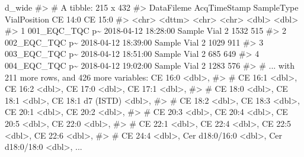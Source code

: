 \documentclass[
  letterpaper,
  DIV=11,
  numbers=noendperiod]{scrreprt}
\newenvironment{Shaded}{\begin{snugshade}}{\end{snugshade}}
\newcommand{\CommentTok}[1]{\textcolor[rgb]{0.37,0.37,0.37}{#1}}
\newcommand{\NormalTok}[1]{\textcolor[rgb]{0.00,0.23,0.31}{#1}}
\begin{document}
\begin{Shaded}
\begin{Highlighting}[]
\NormalTok{d\_wide}
\CommentTok{\#\textgreater{} \# A tibble: 215 x 432}
\CommentTok{\#\textgreater{}   DataFileme     AcqTimeStamp        SampleType VialPosition \textasciigrave{}CE 14:0\textasciigrave{} \textasciigrave{}CE 15:0\textasciigrave{}}
\CommentTok{\#\textgreater{}   \textless{}chr\textgreater{}          \textless{}dttm\textgreater{}              \textless{}chr\textgreater{}      \textless{}chr\textgreater{}            \textless{}dbl\textgreater{}     \textless{}dbl\textgreater{}}
\CommentTok{\#\textgreater{} 1 001\_EQC\_TQC p\textasciitilde{} 2018{-}04{-}12 18:28:00 Sample     Vial 2            1532       515}
\CommentTok{\#\textgreater{} 2 002\_EQC\_TQC p\textasciitilde{} 2018{-}04{-}12 18:39:00 Sample     Vial 2            1029       911}
\CommentTok{\#\textgreater{} 3 003\_EQC\_TQC p\textasciitilde{} 2018{-}04{-}12 18:51:00 Sample     Vial 2             685       649}
\CommentTok{\#\textgreater{} 4 004\_EQC\_TQC p\textasciitilde{} 2018{-}04{-}12 19:02:00 Sample     Vial 2            1283       576}
\CommentTok{\#\textgreater{} \# ... with 211 more rows, and 426 more variables: \textasciigrave{}CE 16:0\textasciigrave{} \textless{}dbl\textgreater{},}
\CommentTok{\#\textgreater{} \#   \textasciigrave{}CE 16:1\textasciigrave{} \textless{}dbl\textgreater{}, \textasciigrave{}CE 16:2\textasciigrave{} \textless{}dbl\textgreater{}, \textasciigrave{}CE 17:0\textasciigrave{} \textless{}dbl\textgreater{}, \textasciigrave{}CE 17:1\textasciigrave{} \textless{}dbl\textgreater{},}
\CommentTok{\#\textgreater{} \#   \textasciigrave{}CE 18:0\textasciigrave{} \textless{}dbl\textgreater{}, \textasciigrave{}CE 18:1\textasciigrave{} \textless{}dbl\textgreater{}, \textasciigrave{}CE 18:1 d7 (ISTD)\textasciigrave{} \textless{}dbl\textgreater{},}
\CommentTok{\#\textgreater{} \#   \textasciigrave{}CE 18:2\textasciigrave{} \textless{}dbl\textgreater{}, \textasciigrave{}CE 18:3\textasciigrave{} \textless{}dbl\textgreater{}, \textasciigrave{}CE 20:1\textasciigrave{} \textless{}dbl\textgreater{}, \textasciigrave{}CE 20:2\textasciigrave{} \textless{}dbl\textgreater{},}
\CommentTok{\#\textgreater{} \#   \textasciigrave{}CE 20:3\textasciigrave{} \textless{}dbl\textgreater{}, \textasciigrave{}CE 20:4\textasciigrave{} \textless{}dbl\textgreater{}, \textasciigrave{}CE 20:5\textasciigrave{} \textless{}dbl\textgreater{}, \textasciigrave{}CE 22:0\textasciigrave{} \textless{}dbl\textgreater{},}
\CommentTok{\#\textgreater{} \#   \textasciigrave{}CE 22:1\textasciigrave{} \textless{}dbl\textgreater{}, \textasciigrave{}CE 22:4\textasciigrave{} \textless{}dbl\textgreater{}, \textasciigrave{}CE 22:5\textasciigrave{} \textless{}dbl\textgreater{}, \textasciigrave{}CE 22:6\textasciigrave{} \textless{}dbl\textgreater{},}
\CommentTok{\#\textgreater{} \#   \textasciigrave{}CE 24:4\textasciigrave{} \textless{}dbl\textgreater{}, \textasciigrave{}Cer d18:0/16:0\textasciigrave{} \textless{}dbl\textgreater{}, \textasciigrave{}Cer d18:0/18:0\textasciigrave{} \textless{}dbl\textgreater{}, ...}
\end{Highlighting}
\end{Shaded}
\end{document}
